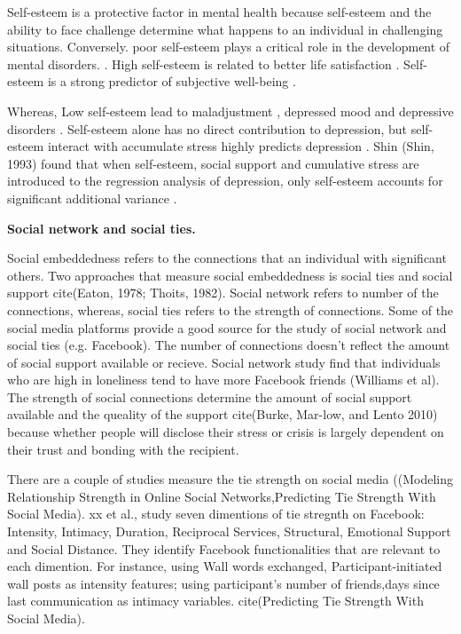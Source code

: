 Self-esteem is a protective factor in mental health because self-esteem and the ability to face challenge determine what happens to an individual in challenging situations. Conversely. poor self-esteem plays a critical role in the development of mental disorders. \cite{mann2004self}. High self-esteem is related to better life satisfaction \cite{zimmerman2000self}.  Self-esteem is a strong predictor of subjective well-being \cite{furnham2000perceived}. 

Whereas, Low self-esteem lead to maladjustment \cite{garmezy1984study}, depressed mood and depressive disorders \cite{rice1998self,dori1999depression}. Self-esteem alone has no direct contribution to depression, but self-esteem interact with accumulate stress highly predicts depression \cite{miller1989self}.  Shin (Shin, 1993) found that when self-esteem, social support and cumulative stress are introduced to the regression analysis of depression, only self-esteem accounts for significant additional variance \cite{shin1993factors}. 


\textbf{Social network and social ties.}

Social embeddedness refers to the connections that an individual with significant others. Two approaches that measure social embeddedness is social ties and social support cite(Eaton, 1978; Thoits, 1982). Social network refers to number of the connections, whereas, social ties refers to the strength of connections. Some of the social media platforms provide a good source for the study of social network and social ties (e.g. Facebook). The number of connections doesn't reflect the amount of social support available or recieve.  Social network study find that individuals who are high in loneliness tend to have more Facebook friends (Williams et al). The strength of social connections determine the amount of social support available and the queality of the support cite(Burke, Mar-low, and Lento 2010) because whether people will disclose their stress or crisis is largely dependent on their trust and bonding with the recipient.


There are a couple of studies measure the tie strength on social media ((Modeling Relationship Strength in Online Social Networks,Predicting Tie Strength With Social Media). xx et al., study seven dimentions of tie stregnth on Facebook: Intensity, Intimacy, Duration, Reciprocal Services,
Structural, Emotional Support and Social Distance. They identify Facebook functionalities that are relevant to each dimention. For instance, using Wall words exchanged, Participant-initiated wall posts as intensity features; using participant’s number of friends,days since last communication as intimacy variables.  cite(Predicting Tie Strength With Social Media). 


